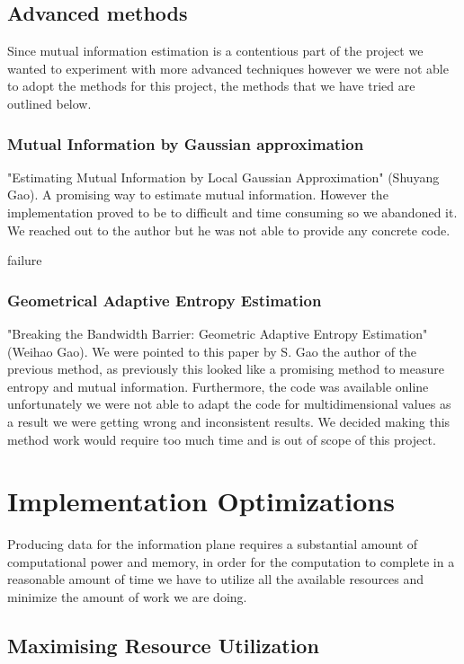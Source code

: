 \subsection{Advanced methods} \label{ssection:advanced}

Since mutual information estimation is a contentious part of the project we
wanted to experiment with more advanced techniques however we were not able to
adopt the methods for this project, the methods that we have tried are outlined
below.

\subsubsection{Mutual Information by Gaussian approximation}
  
  "Estimating Mutual Information by Local Gaussian Approximation" (Shuyang Gao). A
  promising way to estimate mutual information. However the implementation
  proved to be to difficult and time consuming so we abandoned it. We reached
  out to the author but he was not able to provide any concrete code.


  failure
\subsubsection{Geometrical Adaptive Entropy Estimation}

  "Breaking the Bandwidth Barrier: Geometric Adaptive Entropy Estimation"
  (Weihao Gao). We were pointed to this paper by S. Gao the author of the
  previous method, as previously this looked like a promising method to measure
  entropy and mutual information. Furthermore, the code was available online
  unfortunately we were not able to adapt the code for multidimensional values
  as a result we were getting wrong and inconsistent results. We decided making
  this method work would require too much time and is out of scope of this
  project.

\section{Implementation Optimizations}

Producing data for the information plane requires a substantial amount of
computational power and memory, in order for the computation to complete in a
reasonable amount of time we have to utilize all the available resources and
minimize the amount of work we are doing.

\subsection{Maximising Resource Utilization}


